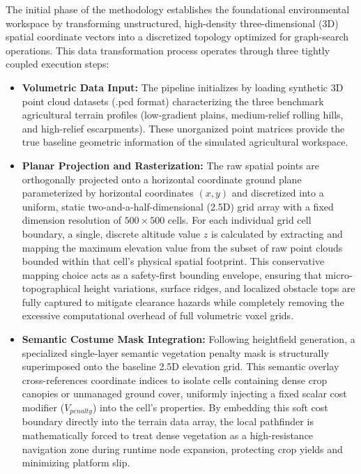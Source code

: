 The initial phase of the methodology establishes the foundational environmental workspace by
transforming unstructured, high-density three-dimensional (3D) spatial coordinate vectors into a
discretized topology optimized for graph-search operations. This data transformation process
operates through three tightly coupled execution steps:

\begin{itemize}
    \item \textbf{Volumetric Data Input:} The pipeline initializes by loading synthetic 3D point cloud datasets (.pcd format) characterizing the three benchmark agricultural terrain profiles (low-gradient plains, medium-relief rolling hills, and high-relief escarpments). These unorganized point matrices provide the true baseline geometric information of the simulated agricultural workspace.

    \item \textbf{Planar Projection and Rasterization:} The raw spatial points are orthogonally projected onto a horizontal coordinate ground plane parameterized by horizontal coordinates $(x, y)$ and discretized into a uniform, static two-and-a-half-dimensional (2.5D) grid array with a fixed dimension resolution of $500 \times 500$ cells. For each individual grid cell boundary, a single, discrete altitude value $z$ is calculated by extracting and mapping the maximum elevation value from the subset of raw point clouds bounded within that cell's physical spatial footprint. This conservative mapping choice acts as a safety-first bounding envelope, ensuring that micro-topographical height variations, surface ridges, and localized obstacle tops are fully captured to mitigate clearance hazards while completely removing the excessive computational overhead of full volumetric voxel grids.

    \item \textbf{Semantic Costume Mask Integration:} Following heightfield generation, a specialized single-layer semantic vegetation penalty mask is structurally superimposed onto the baseline 2.5D elevation grid. This semantic overlay cross-references coordinate indices to isolate cells containing dense crop canopies or unmanaged ground cover, uniformly injecting a fixed scalar cost modifier ($V_{penalty}$) into the cell's properties. By embedding this soft cost boundary directly into the terrain data array, the local pathfinder is mathematically forced to treat dense vegetation as a high-resistance navigation zone during runtime node expansion, protecting crop yields and minimizing platform slip.
\end{itemize}


